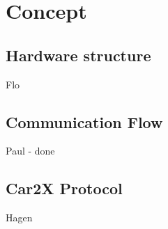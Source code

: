 \chapter{Concept}

\section{Hardware structure}
Flo

\section{Communication Flow}
Paul - done

\section{Car2X Protocol}
Hagen
